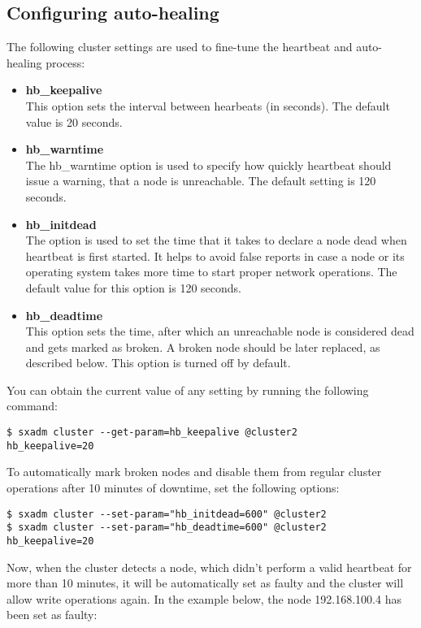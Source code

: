 \subsection{Configuring auto-healing}
The following cluster settings are used to fine-tune the heartbeat and auto-healing
process:
\begin{itemize}
    \item \textbf{hb\_keepalive}\\
    This option sets the interval between hearbeats (in seconds). The default
    value is 20 seconds.
    \item \textbf{hb\_warntime}\\
    The hb\_warntime option is used to specify how quickly heartbeat should issue
    a warning, that a node is unreachable. The default setting is 120 seconds.
    \item \textbf{hb\_initdead}\\
    The option is used to set the time that it takes to declare a node dead when
    heartbeat is first started. It helps to avoid false reports in case a node
    or its operating system takes more time to start proper network operations.
    The default value for this option is 120 seconds.
    \item \textbf{hb\_deadtime}\\
    This option sets the time, after which an unreachable node is considered dead
    and gets marked as broken. A broken node should be later replaced, as described
    below. This option is turned off by default.
\end{itemize}
You can obtain the current value of any setting by running the following command:
\begin{lstlisting}
$ sxadm cluster --get-param=hb_keepalive @cluster2
hb_keepalive=20
\end{lstlisting}
To automatically mark broken nodes and disable them from regular cluster
operations after 10 minutes of downtime, set the following options:
\begin{lstlisting}
$ sxadm cluster --set-param="hb_initdead=600" @cluster2
$ sxadm cluster --set-param="hb_deadtime=600" @cluster2
hb_keepalive=20
\end{lstlisting}
Now, when the cluster detects a node, which didn't perform a valid heartbeat
for more than 10 minutes, it will be automatically set as faulty and the cluster
will allow write operations again. In the example below, the node 192.168.100.4
has been set as faulty:
